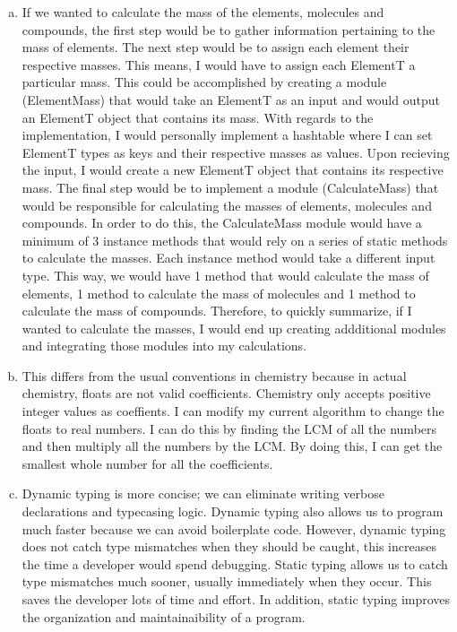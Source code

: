 \documentclass[12pt]{article}
\begin{document}
\begin{enumerate}[a)]
\item If we wanted to calculate the mass of the elements, molecules and compounds, the first step would be to gather information pertaining to the mass of elements. The next step would be to assign
each element their respective masses. This means, I would have to assign each ElementT a particular mass. This could be accomplished by creating a module (ElementMass) that would take an ElementT as an input and would
output an ElementT object that contains its mass. With regards to the implementation, I would personally implement a hashtable where I can set ElementT types as keys and their respective masses as values.
Upon recieving the input, I would create a new ElementT object that contains its respective mass. The final step would be to implement a module (CalculateMass) that would be responsible for calculating the masses of elements, molecules and compounds.
In order to do this, the CalculateMass module would have a minimum of 3 instance methods that would rely on a series of static methods to calculate the masses. Each instance method would take a different input type. 
This way, we would have 1 method that would calculate the mass of elements, 1 method to calculate the mass of molecules and 1 method to calculate the mass of compounds.
Therefore, to quickly summarize, if I wanted to calculate the masses, I would end up creating addditional modules and integrating those modules into my calculations.

\item This differs from the usual conventions in chemistry because in actual chemistry, floats are not valid coefficients. Chemistry only accepts positive integer values as coeffients. I can modify my current algorithm to change the floats
to real numbers. I can do this by finding the LCM of all the numbers and then multiply all the numbers by the LCM. By doing this, I can get the smallest whole number for all the coefficients.

\item Dynamic typing is more concise; we can eliminate writing verbose declarations and typecasing logic. Dynamic typing also allows us to program much faster because we can avoid boilerplate code.
However, dynamic typing does not catch type mismatches when they should be caught, this increases the time a developer would spend debugging. 
Static typing allows us to catch type mismatches much sooner, usually immediately when they occur. This saves the developer lots of time and effort. In addition, static typing
improves the organization and maintainaibility of a program.


\end{enumerate}
\end{document}
